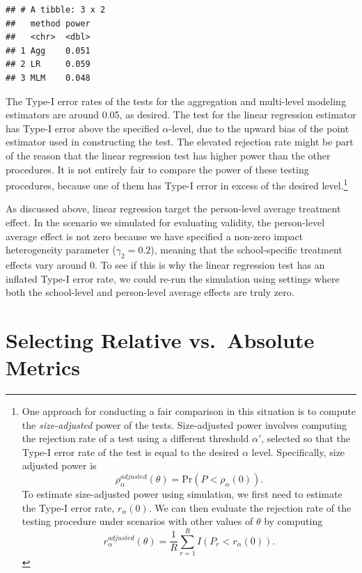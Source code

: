 \documentclass[
]{book}
\newcommand{\Prob}{\text{Pr}}
\begin{document}
\begin{verbatim}
## # A tibble: 3 x 2
##   method power
##   <chr>  <dbl>
## 1 Agg    0.051
## 2 LR     0.059
## 3 MLM    0.048
\end{verbatim}

The Type-I error rates of the tests for the aggregation and multi-level modeling estimators are around 0.05, as desired.
The test for the linear regression estimator has Type-I error above the specified \(\alpha\)-level, due to the upward bias of the point estimator used in constructing the test.
The elevated rejection rate might be part of the reason that the linear regression test has higher power than the other procedures.
It is not entirely fair to compare the power of these testing procedures, because one of them has Type-I error in excess of the desired level.\footnote{One approach for conducting a fair comparison in this situation is to compute the \emph{size-adjusted} power of the tests.
  Size-adjusted power involves computing the rejection rate of a test using a different threshold \(\alpha'\), selected so that the Type-I error rate of the test is equal to the desired \(\alpha\) level.
  Specifically, size adjusted power is
  \[
  \rho^{adjusted}_\alpha(\theta) = \Prob(P < \rho_\alpha(0)).
  \]
  To estimate size-adjusted power using simulation, we first need to estimate the Type-I error rate, \(r_\alpha(0)\). We can then evaluate the rejection rate of the testing procedure under scenarios with other values of \(\theta\) by computing
  \[
  r^{adjusted}_\alpha(\theta) = \frac{1}{R} \sum_{r=1}^R I(P_r < r_{\alpha}(0)).
  \]}

As discussed above, linear regression target the person-level average treatment effect. In the scenario we simulated for evaluating validity, the person-level average effect is not zero because we have specified a non-zero impact heterogeneity parameter (\(\gamma_2=0.2\)), meaning that the school-specific treatment effects vary around 0.
To see if this is why the linear regression test has an inflated Type-I error rate, we could re-run the simulation using settings where both the school-level and person-level average effects are truly zero.

\section{Selecting Relative vs.~Absolute Metrics}\label{sec-relative-performance}
\end{document}
